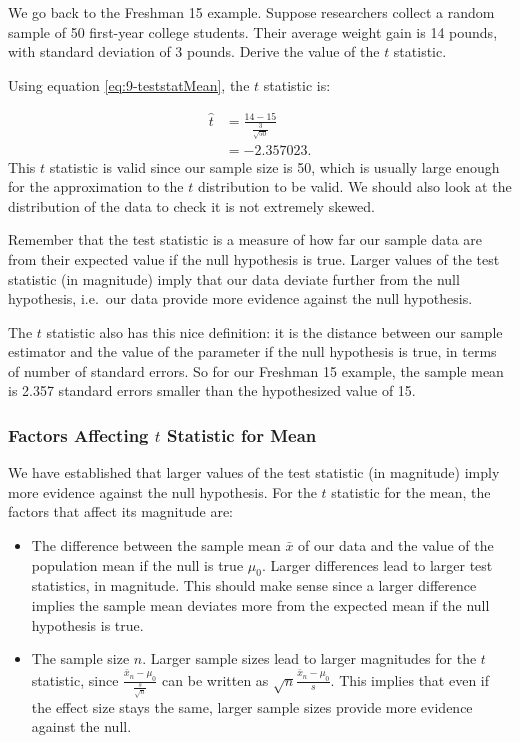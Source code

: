\documentclass[
]{book}
\theoremstyle{definition}
\theoremstyle{definition}
\theoremstyle{definition}
\theoremstyle{definition}
\theoremstyle{remark}
\begin{document}
We go back to the Freshman 15 example. Suppose researchers collect a random sample of 50 first-year college students. Their average weight gain is 14 pounds, with standard deviation of 3 pounds. Derive the value of the \(t\) statistic.

Using equation \eqref{eq:9-teststatMean}, the \(t\) statistic is:

\[
\begin{split}
\hat{t} &= \frac{14-15}{\frac{3}{\sqrt{50}}} \\
        &= -2.357023.
\end{split}
\]
This \(t\) statistic is valid since our sample size is 50, which is usually large enough for the approximation to the \(t\) distribution to be valid. We should also look at the distribution of the data to check it is not extremely skewed.

Remember that the test statistic is a measure of how far our sample data are from their expected value if the null hypothesis is true. Larger values of the test statistic (in magnitude) imply that our data deviate further from the null hypothesis, i.e.~our data provide more evidence against the null hypothesis.

The \(t\) statistic also has this nice definition: it is the distance between our sample estimator and the value of the parameter if the null hypothesis is true, in terms of number of standard errors. So for our Freshman 15 example, the sample mean is 2.357 standard errors smaller than the hypothesized value of 15.

\hypertarget{factors}{%
\subsubsection{\texorpdfstring{Factors Affecting \(t\) Statistic for Mean}{Factors Affecting t Statistic for Mean}}\label{factors}}

We have established that larger values of the test statistic (in magnitude) imply more evidence against the null hypothesis. For the \(t\) statistic for the mean, the factors that affect its magnitude are:

\begin{itemize}
\item
  The difference between the sample mean \(\bar{x}\) of our data and the value of the population mean if the null is true \(\mu_0\). Larger differences lead to larger test statistics, in magnitude. This should make sense since a larger difference implies the sample mean deviates more from the expected mean if the null hypothesis is true.
\item
  The sample size \(n\). Larger sample sizes lead to larger magnitudes for the \(t\) statistic, since \(\frac{\bar{x}_n - \mu_0}{\frac{s}{\sqrt{n}}}\) can be written as \(\sqrt{n}\frac{\bar{x}_n - \mu_0}{s}\). This implies that even if the effect size stays the same, larger sample sizes provide more evidence against the null.
\end{itemize}
\end{document}
